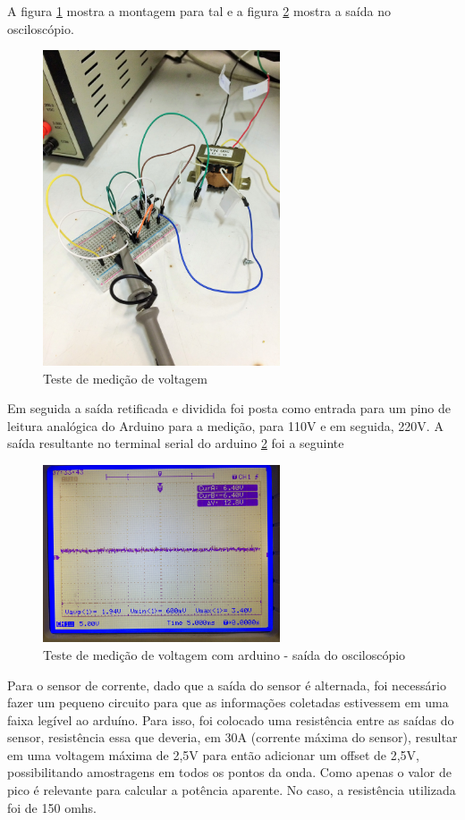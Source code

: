 A figura \ref{fig:teste-medicao-voltagem} mostra a montagem para tal e a figura \ref{fig:teste-medicao-voltagem-osc} mostra a saída no osciloscópio.

\begin{figure}[H]
\centering
\includegraphics[width=7cm,keepaspectratio]{figuras/teste-medicao-voltagem.jpg} 
\caption{\label{fig:teste-medicao-voltagem} Teste de medição de voltagem} 
\end{figure}

Em seguida a saída retificada e dividida foi posta como entrada para um pino de leitura analógica do Arduino para a medição, para 110V e em seguida, 220V. A saída resultante no terminal serial do arduino \ref{fig:teste-medicao-voltagem-osc} foi a seguinte

\begin{figure}[H]
\centering
\includegraphics[width=7cm,keepaspectratio]{figuras/teste-medicao-voltagem-osc.jpg} 
\caption{\label{fig:teste-medicao-voltagem-osc} Teste de medição de voltagem com arduino - saída do osciloscópio}
\end{figure}

Para o sensor de corrente, dado que a saída do sensor é alternada, foi necessário fazer um pequeno circuito para que as informações coletadas estivessem em uma faixa legível ao arduíno. Para isso, foi colocado uma resistência entre as saídas do sensor, resistência essa que deveria, em 30A (corrente máxima do sensor), resultar em uma voltagem máxima de 2,5V para então adicionar um offset de 2,5V, possibilitando amostragens em todos os pontos da onda. Como apenas o valor de pico é relevante para calcular a potência aparente.
No caso, a resistência utilizada foi de 150 omhs. 

